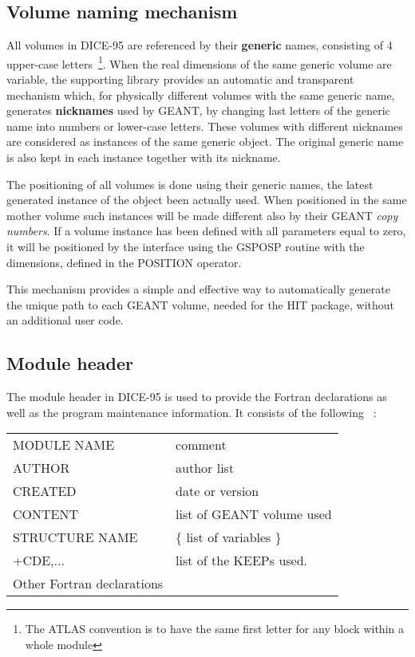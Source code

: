 \subsection{Volume naming mechanism}
  All volumes in DICE-95 are referenced by their  {\bf generic} names,
 consisting of 4 upper-case letters~\footnote{
  The ATLAS convention is to have the same first letter
  for any block within a whole module}.
 When the real dimensions of the same generic volume are variable, 
the supporting
\as library provides an automatic and transparent mechanism which,
for physically different volumes with the same generic name,
generates {\bf nicknames } used by GEANT,
by changing last letters of the generic name
into numbers or lower-case letters.
These volumes with different nicknames
are considered as instances of the same generic object.
The original generic name is also kept in each instance
together with its nickname.
 
The positioning of all volumes is done using their generic names,
the latest generated instance of the object been actually used.
When positioned in the same mother volume such instances
will be made different also  by their  GEANT {\it copy numbers}.
If a volume instance has been defined with all parameters equal to zero,
it will be  positioned by the \as interface using
the GSPOSP routine with the dimensions,
defined in the POSITION operator.
 
This mechanism provides a simple and effective way
to automatically generate the unique path to each
GEANT volume, needed for the HIT package,
without an additional user code.
 
 
 
\subsection{Module header}
 
 The module header in DICE-95 is used to provide the  Fortran
 declarations as well as the program maintenance information.
 It consists of the following ~:
 
\begin{center}   \begin{tabular}{|ll|}               \hline
  MODULE NAME    & comment                      \\
  AUTHOR         & author list                  \\
  CREATED        & date or version              \\
  CONTENT        & list of GEANT volume used    \\
  STRUCTURE NAME & \{ list of variables \}      \\
  +CDE,...       & list of the KEEPs used.      \\
 Other Fortran   declarations  &             \\      \hline
\end{tabular}   \end{center}
 
